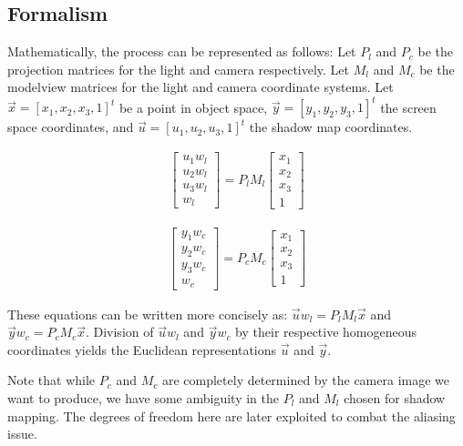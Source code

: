 \documentclass[]{article}  %
\begin{document}
\subsection{Formalism}

Mathematically, the process can be represented as follows: Let $P_l$ and $P_c$ be the projection matrices for the light and camera respectively.  Let $M_l$ and $M_c$ be the modelview matrices for the light and camera coordinate systems.  Let $\vec{x} = [x_1,x_2,x_3,1]^t$ be a point in object space, $\vec{y} = [y_1,y_2,y_3,1]^t$ the screen space coordinates, and $\vec{u} = [u_1,u_2,u_3,1]^t$ the shadow map coordinates.  

\begin{eqnarray}
\label{eqn:hom}
    \left[ \begin{array}{c}
		u_1  w_l \\
		u_2  w_l \\
		u_3  w_l \\
		w_l     \end{array} \right] =  P_l M_l \left[ \begin{array}{c}
		x_1 \\
		x_2 \\
		x_3 \\
		1     \end{array} \right]
\end{eqnarray}

\begin{eqnarray}
\label{eqn:hom}
    \left[ \begin{array}{c}
		y_1  w_c \\
		y_2  w_c \\
		y_3  w_c \\
		w_c     \end{array} \right] =  P_c M_c \left[ \begin{array}{c}
		x_1 \\
		x_2 \\
		x_3 \\
		1     \end{array} \right]
\end{eqnarray}

These equations can be written more concisely as: $\vec{u}w_l = P_l M_l \vec{x}$ and $\vec{y} w_c = P_c M_c \vec{x}$.  Division of $\vec{u}w_l$ and $\vec{y}w_c$ by their respective homogeneous coordinates yields the Euclidean representations $\vec{u}$ and $\vec{y}$.

Note that while $P_c$ and $M_c$ are completely determined by the camera image we want to produce, we have some ambiguity in the $P_l$ and $M_l$ chosen for shadow mapping.  The degrees of freedom here are later exploited to combat the aliasing issue.  
\end{document}
